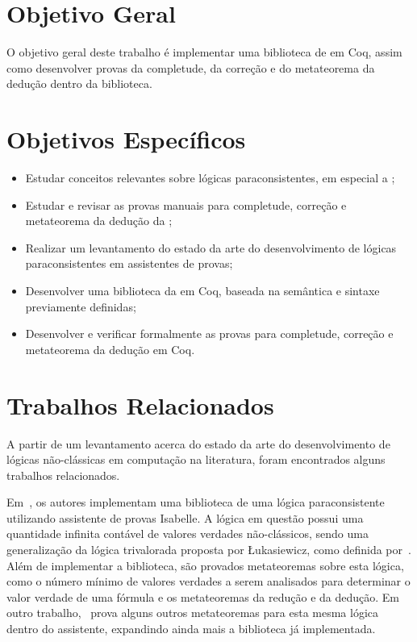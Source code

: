     \section{Objetivo Geral}
        O objetivo geral deste trabalho é implementar uma biblioteca de \lfium{} em Coq, assim como desenvolver provas da completude, da correção e do metateorema da dedução dentro da biblioteca.


    \section{Objetivos Específicos}
        \begin{itemize}
            \item Estudar conceitos relevantes sobre lógicas paraconsistentes, em especial a \lfium{};
            \item Estudar e revisar as provas manuais para completude, correção e metateorema da dedução da \lfium{};
            \item Realizar um levantamento do estado da arte do desenvolvimento de lógicas paraconsistentes em assistentes de provas;
            \item Desenvolver uma biblioteca da \lfium{} em Coq, baseada na semântica e sintaxe previamente definidas;
            \item Desenvolver e verificar formalmente as provas para completude, correção e metateorema da dedução em Coq.
        \end{itemize}


    \section{Trabalhos Relacionados}
        A partir de um levantamento acerca do estado da arte do desenvolvimento de lógicas não-clássicas em computação na literatura, foram encontrados alguns trabalhos relacionados.
    
        Em~\cite{Villadsen2017}, os autores implementam uma biblioteca de uma lógica paraconsistente utilizando assistente de provas Isabelle. A lógica em questão possui uma quantidade infinita contável de valores verdades não-clássicos, sendo uma generalização da lógica trivalorada proposta por {\L}ukasiewicz, como definida por~. Além de implementar a biblioteca, são provados metateoremas sobre esta lógica, como o número mínimo de valores verdades a serem analisados para determinar o valor verdade de uma fórmula e os metateoremas da redução e da dedução. Em outro trabalho,~ prova alguns outros metateoremas para esta mesma lógica dentro do assistente, expandindo ainda mais a biblioteca já implementada.

